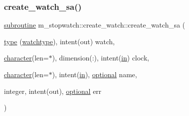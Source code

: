 \subsubsection{\texorpdfstring{create\+\_\+watch\+\_\+sa()}{create\_watch\_sa()}}
{\footnotesize\ttfamily \hyperlink{M__stopwatch_83_8txt_acfbcff50169d691ff02d4a123ed70482}{subroutine} m\+\_\+stopwatch\+::create\+\_\+watch\+::create\+\_\+watch\+\_\+sa (\begin{DoxyParamCaption}\item[{\hyperlink{stop__watch_83_8txt_a70f0ead91c32e25323c03265aa302c1c}{type} (\hyperlink{structm__stopwatch_1_1watchtype}{watchtype}), intent(out)}]{watch,  }\item[{\hyperlink{option__stopwatch_83_8txt_abd4b21fbbd175834027b5224bfe97e66}{character}(len=$\ast$), dimension(\+:), intent(\hyperlink{M__journal_83_8txt_afce72651d1eed785a2132bee863b2f38}{in})}]{clock,  }\item[{\hyperlink{option__stopwatch_83_8txt_abd4b21fbbd175834027b5224bfe97e66}{character}(len=$\ast$), intent(\hyperlink{M__journal_83_8txt_afce72651d1eed785a2132bee863b2f38}{in}), \hyperlink{option__stopwatch_83_8txt_aa4ece75e7acf58a4843f70fe18c3ade5}{optional}}]{name,  }\item[{integer, intent(out), \hyperlink{option__stopwatch_83_8txt_aa4ece75e7acf58a4843f70fe18c3ade5}{optional}}]{err }\end{DoxyParamCaption})\hspace{0.3cm}{\ttfamily [private]}}

\mbox{\label{interfacem__stopwatch_1_1create__watch_afbf377b4aee9a7c482a2275cddb63fb7}} 
